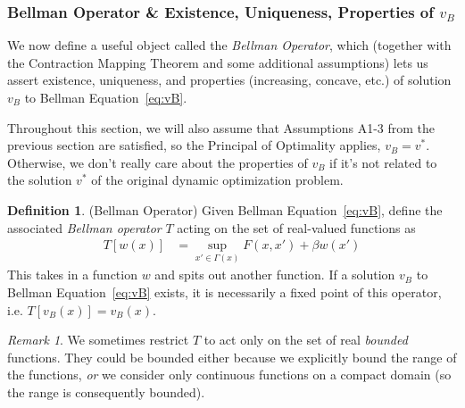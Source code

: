 \documentclass[12pt]{book}
\numberwithin{equation}{section} %
\theoremstyle{plain}
\newtheorem{prop}[thm]{Proposition}
\theoremstyle{definition}
\newtheorem{defn}[thm]{Definition}
\theoremstyle{remark}
\newtheorem*{rmk}{Remark}
\newcommand{\sB}{\mathscr{B}}
\newcommand{\R}{\mathbb{R}}
\begin{document}

\clearpage
\subsubsection{%
Bellman Operator \& Existence, Uniqueness, Properties of $v_B$
}

We now define a useful object called the \emph{Bellman Operator}, which
(together with the Contraction Mapping Theorem and some additional
assumptions) lets us assert existence, uniqueness, and properties
(increasing, concave, etc.) of solution $v_B$ to Bellman
Equation~\ref{eq:vB}.

Throughout this section, we will also assume that Assumptions A1-3 from
the previous section are satisfied, so the Principal of Optimality
applies, $v_B=v^*$. Otherwise, we don't really care about the properties
of $v_B$ if it's not related to the solution $v^*$ of the original
dynamic optimization problem.

\begin{defn}(Bellman Operator)
Given Bellman Equation~\ref{eq:vB}, define the associated
\emph{Bellman operator} $T$ acting on the set of real-valued functions
as
\begin{align}
  T[w(x)]
  &= \sup_{x'\in\Gamma(x)}
  F(x,x') + \beta w(x')
  \label{defn:bellman-operator}
\end{align}
This takes in a function $w$ and spits out another function.
If a solution $v_B$ to Bellman Equation~\ref{eq:vB} exists, it is
necessarily a fixed point of this operator, i.e. $T[v_B(x)]=v_B(x)$.
\end{defn}

\begin{rmk}
We sometimes restrict $T$ to act only on the set of real \emph{bounded}
functions. They could be bounded either because we explicitly bound the
range of the functions, \emph{or} we consider only continuous functions
on a compact domain (so the range is consequently bounded).
\end{rmk}

\end{document}
